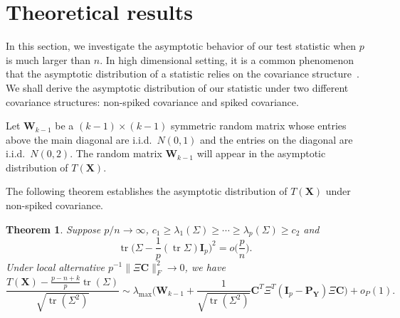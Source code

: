 \documentclass[12pt]{article} %
\DeclareMathOperator{\mytr}{tr}
\newcommand{\bX}{\mathbf{X}}
\newcommand{\bP}{\mathbf{P}}
\newcommand{\bY}{\mathbf{Y}}
\newcommand{\bC}{\mathbf{C}}
\newcommand{\bI}{\mathbf{I}}
\newcommand{\bW}{\mathbf{W}}
\newtheorem{theorem}{Theorem}
\theoremstyle{definition}
\begin{document}
   
   
   










\section{Theoretical results}

In this section, we investigate the asymptotic behavior of our test statistic when $p$ is much larger than $n$.
In high dimensional setting, it is a common phenomenon that the asymptotic distribution of a statistic relies on the covariance structure~\citep{Ma2015A}.
We shall derive the asymptotic distribution of our statistic under two different covariance structures: non-spiked covariance and spiked covariance.

Let $\bW_{k-1}$ be a $(k-1)\times(k-1)$ symmetric random matrix whose entries above the main diagonal are i.i.d.\ $N(0,1)$ and the entries on the diagonal are i.i.d.\ $N(0,2)$.
The random matrix $\bW_{k-1}$ will appear in the asymptotic distribution of $T(\bX)$.

The following theorem establishes the asymptotic distribution of $T(\bX)$ under non-spiked covariance.
\begin{theorem}\label{nonSpiked}
    Suppose $p/n\to \infty$, $c_1\geq \lambda_1(\Sigma)\geq \cdots\geq \lambda_p(\Sigma)\geq c_2$ and
    $$
    \mytr\Big(\Sigma-\frac{1}{p}(\mytr\Sigma)\bI_p\Big)^2=o\big(\frac{p}{n}\big).
    $$
    Under local alternative $p^{-1}\|\Xi \bC\|_F^2\to 0$,
    we have
    $$
    \frac{T(\bX)-\frac{p-n+k}{p}\mytr(\Sigma)}{\sqrt{\mytr(\Sigma^2)}}
    \sim
    \lambda_{\max}\Big( \bW_{k-1} +\frac{1}{\sqrt{\mytr(\Sigma^2)}} \bC^T \Xi^T (\bI_p-\bP_{\bY})\Xi \bC\Big)+o_P(1).
    $$
\end{theorem}
\end{document}

